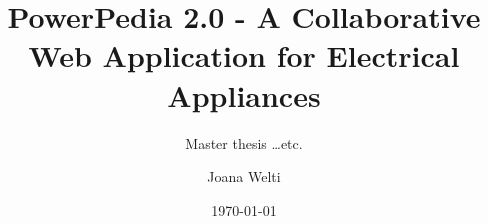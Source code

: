 \documentclass[fontsize=11pt,paper=a4]{scrartcl}
\begin{document}
\title{PowerPedia 2.0 - A Collaborative Web Application for Electrical Appliances}
\subtitle{Master thesis \dots etc.}
\date{\today}
\author{Joana Welti}
\maketitle

\tableofcontents









{}

\end{document}
